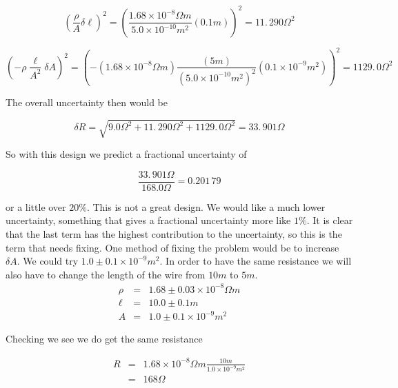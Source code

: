 \begin{equation*}
	\left( \frac{\rho }{A}\delta \ell \right) ^{2}=\left( \frac{1.68\times
		10^{-8}\unit{\Omega}\unit{m}}{5.0\times 10^{-10}\unit{m}^{2}}\left( 0.1\unit{m}\right) \right) 	^{2}=11.\,\allowbreak 290\unit{\Omega}^{2}
\end{equation*}

\begin{equation*}
	\left( -\rho \frac{\ell }{A^{2}}\delta A\right) ^{2}=\left( -\left(
	1.68\times 10^{-8}\unit{\Omega}\unit{m}\right) \frac{\left( 5\unit{m}\right) }{\left( 5.0\times 10^{-10} \unit{m}^{2}\right) ^{2}}\left( 0.1\times 10^{-9}\unit{m}^{2}\right) \right)
	^{2}=1129.\,\allowbreak 0\unit{\Omega}^{2}
\end{equation*}

The overall uncertainty then would be

\begin{equation*}
	\delta R=\sqrt{9.0\unit{\Omega}^{2}+11.\,\allowbreak 290\unit{\Omega}^{2}+1129.\,\allowbreak 0\unit{\Omega}^{2}}=33.\,\allowbreak 901\unit{\Omega}
\end{equation*}

So with this design we predict a fractional uncertainty of 

\begin{equation*}
	\frac{33.\,\allowbreak 901\unit{\Omega}}{168.0\unit{\Omega}}=0.201\,79
\end{equation*}

or a little over $20\%.$ This is not a great design. We would like a much
lower uncertainty, something that gives a fractional uncertainty more like $%
1\%.$ It is clear that the last term has the highest contribution to the
uncertainty, so this is the term that needs fixing. One method of fixing the
problem would be to increase $\delta A.$ We could try $1.0\pm 0.1\times
10^{-9}\unit{m}^{2}.$ In order to have the same resistance we will also have
to change the length of the wire from $10\unit{m}$ to $5\unit{m}$. 
\begin{eqnarray*}
	\rho &=&1.68\pm 0.03\times 10^{-8}\unit{\Omega}\unit{m} \\
	\ell &=&10.0\pm 0.1\unit{m} \\
       A &=&1.0\pm 0.1\times 10^{-9}\unit{m}^{2}
\end{eqnarray*}

Checking we see we do get the same resistance 

\begin{eqnarray*}
	R &=&1.68\times 10^{-8}\unit{\Omega	}\unit{m}\frac{10\unit{m}}{1.0\times 10^{-9}\unit{m}^{2}} \\
	&=&168\unit{\Omega}
\end{eqnarray*}

